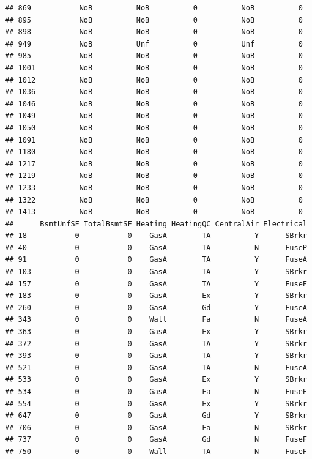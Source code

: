 \documentclass[]{article}
\begin{document}
\begin{verbatim}
## 869           NoB          NoB          0          NoB          0
## 895           NoB          NoB          0          NoB          0
## 898           NoB          NoB          0          NoB          0
## 949           NoB          Unf          0          Unf          0
## 985           NoB          NoB          0          NoB          0
## 1001          NoB          NoB          0          NoB          0
## 1012          NoB          NoB          0          NoB          0
## 1036          NoB          NoB          0          NoB          0
## 1046          NoB          NoB          0          NoB          0
## 1049          NoB          NoB          0          NoB          0
## 1050          NoB          NoB          0          NoB          0
## 1091          NoB          NoB          0          NoB          0
## 1180          NoB          NoB          0          NoB          0
## 1217          NoB          NoB          0          NoB          0
## 1219          NoB          NoB          0          NoB          0
## 1233          NoB          NoB          0          NoB          0
## 1322          NoB          NoB          0          NoB          0
## 1413          NoB          NoB          0          NoB          0
##      BsmtUnfSF TotalBsmtSF Heating HeatingQC CentralAir Electrical
## 18           0           0    GasA        TA          Y      SBrkr
## 40           0           0    GasA        TA          N      FuseP
## 91           0           0    GasA        TA          Y      FuseA
## 103          0           0    GasA        TA          Y      SBrkr
## 157          0           0    GasA        TA          Y      FuseF
## 183          0           0    GasA        Ex          Y      SBrkr
## 260          0           0    GasA        Gd          Y      FuseA
## 343          0           0    Wall        Fa          N      FuseA
## 363          0           0    GasA        Ex          Y      SBrkr
## 372          0           0    GasA        TA          Y      SBrkr
## 393          0           0    GasA        TA          Y      SBrkr
## 521          0           0    GasA        TA          N      FuseA
## 533          0           0    GasA        Ex          Y      SBrkr
## 534          0           0    GasA        Fa          N      FuseF
## 554          0           0    GasA        Ex          Y      SBrkr
## 647          0           0    GasA        Gd          Y      SBrkr
## 706          0           0    GasA        Fa          N      SBrkr
## 737          0           0    GasA        Gd          N      FuseF
## 750          0           0    Wall        TA          N      FuseF

\end{verbatim}
\end{document}
